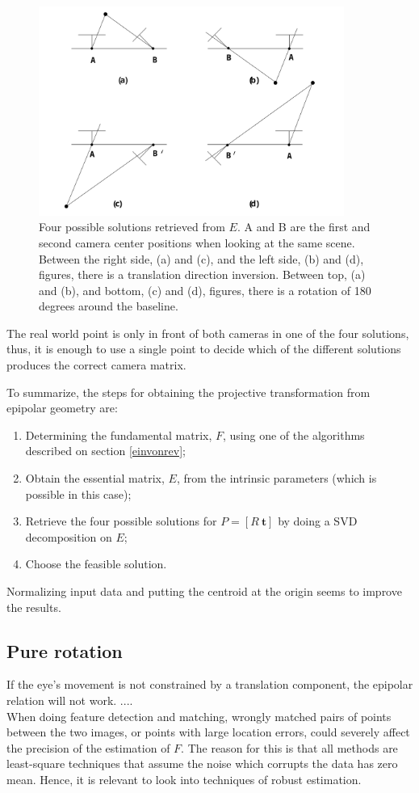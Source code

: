 \begin{figure}[ht]
	\centering
	\includegraphics[width=10cm]{images/ep4sols.png}
	\caption[Four possible solutions retrieved from $E$]{Four possible solutions retrieved from $E$. A and B are the first and second camera center positions when looking at the same scene. Between the right side, (a) and (c), and the left side, (b) and (d), figures, there is a translation direction inversion. Between top, (a) and (b), and bottom, (c) and (d), figures, there is a rotation of 180 degrees around the baseline. \cite{epipolar}}
	\label{sec2:fig:ep4}
\end{figure}
The real world point is only in front of both cameras in one of the four solutions, thus, it is enough to use a single point to decide which of the different solutions produces the correct camera matrix. \cite{epipolar}

To summarize, the steps for obtaining the projective transformation from epipolar geometry are:
\begin{enumerate}
	\item Determining the fundamental matrix, $F$, using one of the algorithms described on section \ref{einvonrev};
	\item Obtain the essential matrix, $E$, from the intrinsic parameters (which is possible in this case);
	\item Retrieve the four possible solutions for $P = [R \ \mathbf{t}]$ by doing a SVD decomposition on $E$;
	\item Choose the feasible solution.
\end{enumerate}

Normalizing input data and putting the centroid at the origin seems to improve the results.

\subsection{Pure rotation}

If the eye's movement is not constrained by a translation component, the epipolar relation will not work. ....\\

When doing feature detection and matching, wrongly matched pairs of points between the two images, or points with large location errors, could severely affect the precision of the estimation of $F$. The reason for this is that all methods are least-square techniques that assume the noise which corrupts the data has zero mean. Hence, it is relevant to look into techniques of robust estimation.\\

